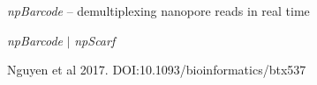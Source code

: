 \documentclass{beamer}
\begin{document}
\begin{frame}{\emph{npBarcode} -- demultiplexing nanopore reads in real time}
\end{frame}

\begin{frame}{\emph{npBarcode} $\vert$ \emph{npScarf}}
\begin{figure}[!hpb]
\centering
{}%
\hfill
{}%
\hfill
{}%
\hfill
{}%
\end{figure}
\vspace*{-0.3cm}
Nguyen et al 2017.  DOI:10.1093/bioinformatics/btx537
\end{frame}
\end{document}
